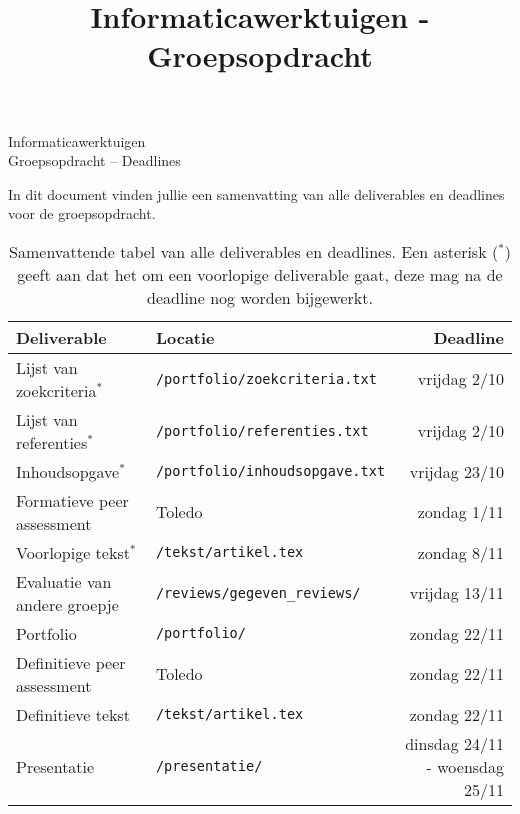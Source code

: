 \documentclass[a4paper]{article}
\title{Informaticawerktuigen - Groepsopdracht}
\begin{document}
\begin{center}
  \huge Informaticawerktuigen \\
  \Huge Groepsopdracht -- Deadlines
\end{center}
\vspace{1em}


In dit document vinden jullie een samenvatting van alle deliverables en deadlines voor de groepsopdracht.

\begin{table}[h]
    \renewcommand{\arraystretch}{1.5}
    \begin{center}
        \begin{tabular}{ l | l r }
            \rowcolor{gray!50}
            \textbf{Deliverable}            & \textbf{Locatie}                      & \textbf{Deadline} \\ \hline
            Lijst van zoekcriteria$^{\ast}$ & \texttt{/portfolio/zoekcriteria.txt}  & vrijdag 2/10 \\
            Lijst van referenties$^{\ast}$  & \texttt{/portfolio/referenties.txt}   & vrijdag 2/10 \\
            Inhoudsopgave$^{\ast}$          & \texttt{/portfolio/inhoudsopgave.txt} & vrijdag 23/10 \\
            Formatieve peer assessment      & Toledo                                & zondag 1/11 \\
            Voorlopige tekst$^{\ast}$       & \texttt{/tekst/artikel.tex}           & zondag 8/11 \\
            Evaluatie van andere groepje    & \texttt{/reviews/gegeven\_reviews/}   & vrijdag 13/11 \\
            Portfolio                       & \texttt{/portfolio/}                  & zondag 22/11 \\
            Definitieve peer assessment     & Toledo                                & zondag 22/11 \\
            Definitieve tekst               & \texttt{/tekst/artikel.tex}           & zondag 22/11 \\
            Presentatie                     & \texttt{/presentatie/}                & dinsdag 24/11 - woensdag 25/11 \\
        \end{tabular}
        \caption{
            Samenvattende tabel van alle deliverables en deadlines.
            Een asterisk ($^{\ast}$) geeft aan dat het om een voorlopige deliverable gaat, deze mag na de deadline nog worden bijgewerkt.
        }
    \end{center}
\end{table}


\end{document}
